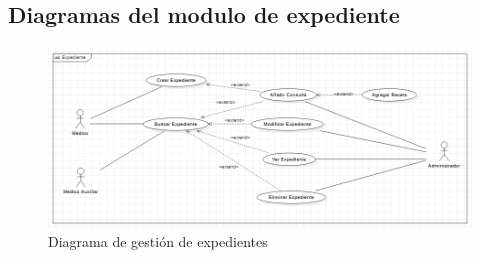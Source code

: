 \documentclass[12pt,letterpaper]{article}
\begin{document}
        \newpage
        \subsection{Diagramas del modulo de expediente}
            \begin{figure}[H]
                \centering
                \includegraphics [scale=0.5]{casosUso/gestionExpediente}
                \caption{Diagrama de gestión de expedientes}
            \end{figure}
            \vfill
            
\end{document}
